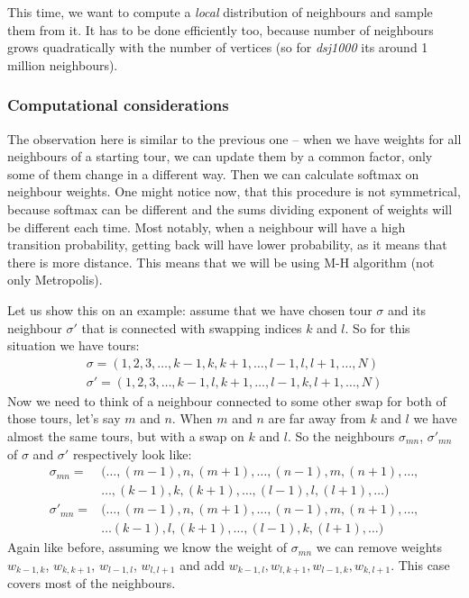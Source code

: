 	This time, we want to compute a \textit{local} distribution of neighbours and sample them from it. It has to be done efficiently too, because number of neighbours grows quadratically with the number of vertices (so for \textit{dsj1000} its around 1 million neighbours).
	
	\subsubsection{Computational considerations}
		The observation here is similar to the previous one -- when we have weights for all neighbours of a starting tour, we can update them by a common factor, only some of them change in a different way. Then we can calculate softmax on neighbour weights. One might notice now, that this procedure is not symmetrical, because softmax can be different and the sums dividing exponent of weights will be different each time. Most notably, when a neighbour will have a high transition probability, getting back will have lower probability, as it means that there is more distance. This means that we will be using M-H algorithm (not only Metropolis).
		
		Let us show this on an example: assume that we have chosen tour $\sigma$ and its neighbour $\sigma'$ that is connected with swapping indices $k$ and $l$. So for this situation we have tours:
		\begin{align*}
			\sigma = (1, 2, 3, \ldots, k-1, k, k+1, \ldots, l-1, l, l+1, \ldots, N) \\
			\sigma' = (1, 2, 3, \ldots, k-1, l, k+1, \ldots, l-1, k, l+1, \ldots, N)
		\end{align*}
		Now we need to think of a neighbour connected to some other swap for both of those tours, let's say $m$ and $n$. When $m$ and $n$ are far away from $k$ and $l$ we have almost the same tours, but with a swap on $k$ and $l$. So the neighbours $\sigma_{mn}$, $\sigma'_{mn}$ of $\sigma$ and $\sigma'$ respectively look like: 
		\begin{align*}
			\sigma_{mn} = &(\ldots, (m-1), n, (m+1), \ldots, (n-1), m,( n+1), \ldots, \\
			&\ldots, (k-1), k, (k+1), \ldots, (l-1), l, (l+1), \ldots) \\
			\sigma'_{mn} = &(\ldots, (m-1), n, (m+1), \ldots, (n-1), m, (n+1), \ldots, \\
			&\ldots (k-1), l, (k+1), \ldots, (l-1), k, (l+1), \ldots)
		\end{align*}
		Again like before, assuming we know the weight of $\sigma_{mn}$ we can remove weights $w_{k-1, k}$, $w_{k, k+1}$, $w_{l-1, l}$, $w_{l, l+1}$ and add $w_{k-1, l}, w_{l, k+1}, w_{l-1, k}, w_{k, l+1}$. This case covers most of the neighbours. 
		
